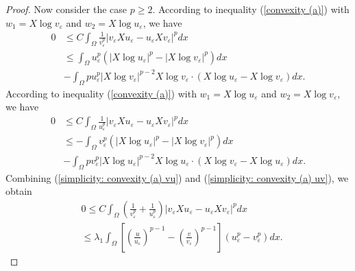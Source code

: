 \documentclass[a4paper,12pt,reqno]{amsart}
\renewcommand\eqref[1]{(\ref{#1})} %
\numberwithin{equation}{section}
\theoremstyle{plain}
\theoremstyle{definition}
\begin{document}
\begin{proof}
Now consider the case $p\geq 2$.
According to inequality  \eqref{convexity (a)} with $w_{1}=X \log v_{\varepsilon}$ and $w_{2}=X \log u_{\varepsilon}$, we have
\begin{equation}\label{simplicity: convexity (a) vu}
\begin{aligned}
0  &\leq C \int_{\Omega}\frac{1}{v_{\varepsilon}^{p}}\left|v_{\varepsilon} X u_{\varepsilon}-u_{\varepsilon} X v_{\varepsilon}\right|^{p} d x \\
& \leq \int_{\Omega}u_{\varepsilon}^{p}\left(\left|X \log u_{\varepsilon}\right|^{p}-\left|X \log v_{\varepsilon}\right|^{p}\right) d x\\
&-\int_{\Omega} p u_{\varepsilon}^{p}\left|X \log v_{\varepsilon}\right|^{p-2} X \log v_{\varepsilon} \cdot\left(X \log u_{\varepsilon}-X \log v_{\varepsilon}\right) d x.
\end{aligned}
\end{equation}
According to inequality \eqref{convexity (a)} with $w_{1}=X \log u_{\varepsilon}$ and $w_{2}=X \log v_{\varepsilon}$, we have
\begin{equation}\label{simplicity: convexity (a) uv}
\begin{aligned}
0 & \leq C \int_{\Omega}\frac{1}{u_{\varepsilon}^{p}}\left|v_{\varepsilon} X u_{\varepsilon}-u_{\varepsilon} X v_{\varepsilon}\right|^{p} d x \\
& \leq-\int_{\Omega}v_{\varepsilon}^{p}\left(\left|X \log u_{\varepsilon}\right|^{p}-\left|X \log v_{\varepsilon}\right|^{p}\right) d x\\
& -\int_{\Omega} p v_{\varepsilon}^{p}\left|X \log u_{\varepsilon}\right|^{p-2} X \log u_{\varepsilon} \cdot\left(X \log v_{\varepsilon}-X \log u_{\varepsilon}\right) d x.
\end{aligned}   
\end{equation}
Combining \eqref{simplicity: convexity (a) vu} and \eqref{simplicity: convexity (a) uv}, we obtain
\begin{equation*}
\begin{aligned}
&0  \leq C \int_{\Omega}\left(\frac{1}{v_{\varepsilon}^{p}}+\frac{1}{u_{\varepsilon}^{p}}\right)\left|v_{\varepsilon} X u_{\varepsilon}-u_{\varepsilon} X v_{\varepsilon}\right|^{p} d x \\
& \leq\lambda_{1} \int_{\Omega}\left[\left(\frac{u}{u_{\varepsilon}}\right)^{p-1}-\left(\frac{v}{v_{\varepsilon}}\right)^{p-1}\right]\left(u_{\varepsilon}^{p}-v_{\varepsilon}^{p}\right) d x.
\end{aligned}    
\end{equation*}

\end{proof}
\end{document}
